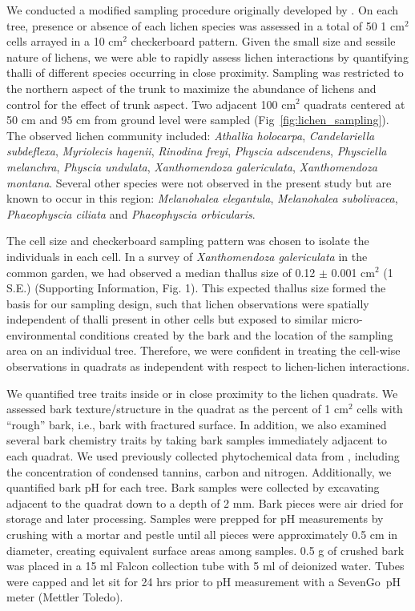 \documentclass[fleqn,12pt]{olplainarticle}
\begin{document}
We conducted a modified sampling procedure originally developed by
\cite{Lamit2015a}. On each tree, presence or absence of each lichen
species was assessed in a total of 50 1 cm$^2$ cells arrayed in a 10
cm$^2$ checkerboard pattern. Given the small size and sessile nature
of lichens, we were able to rapidly assess lichen interactions by
quantifying thalli of different species occurring in close
proximity. Sampling was restricted to the northern aspect of the trunk
to maximize the abundance of lichens and control for the effect of
trunk aspect. Two adjacent 100 cm$^2$ quadrats centered at 50 cm and
95 cm from ground level were sampled
(Fig~\ref{fig:lichen_sampling}). The observed lichen community
included: \textit{Athallia holocarpa}, \textit{Candelariella
  subdeflexa}, \textit{Myriolecis hagenii}, \textit{Rinodina freyi},
\textit{Physcia adscendens}, \textit{Physciella melanchra},
\textit{Physcia undulata}, \textit{Xanthomendoza galericulata},
\textit{Xanthomendoza montana}. Several other species were not
observed in the present study but are known to occur in this region:
\textit{Melanohalea elegantula}, \textit{Melanohalea subolivacea},
\textit{Phaeophyscia ciliata} and \textit{Phaeophyscia orbicularis}.

The cell size and checkerboard sampling pattern was chosen to isolate
the individuals in each cell. In a survey of \textit{Xanthomendoza
  galericulata} in the common garden, we had observed a median thallus
size of 0.12 $\pm$ 0.001 cm$^2$ (1 S.E.)  (Supporting Information,
Fig. 1). This expected thallus size formed the basis for our sampling
design, such that lichen observations were spatially independent of
thalli present in other cells but exposed to similar
micro-environmental conditions created by the bark and the location of
the sampling area on an individual tree. Therefore, we were confident
in treating the cell-wise observations in quadrats as independent with
respect to lichen-lichen interactions. 

We quantified tree traits inside or in close proximity to the lichen
quadrats. We assessed bark texture/structure in the quadrat as the
percent of 1 cm$^2$ cells with ``rough'' bark, i.e., bark with
fractured surface. In addition, we also examined several bark
chemistry traits by taking bark samples immediately adjacent to each
quadrat.  We used previously collected phytochemical data from
\cite{Lamit2011}, including the concentration of condensed tannins,
carbon and nitrogen. Additionally, we quantified bark pH for each
tree.  Bark samples were collected by excavating adjacent to the
quadrat down to a depth of 2 mm. Bark pieces were air dried for
storage and later processing. Samples were prepped for pH measurements
by crushing with a mortar and pestle until all pieces were
approximately 0.5 cm in diameter, creating equivalent surface areas
among samples. 0.5 g of crushed bark was placed in a 15 ml Falcon
collection tube with 5 ml of deionized water. Tubes were capped and
let sit for 24 hrs prior to pH measurement with a
SevenGo\texttrademark\ pH meter (Mettler Toledo).
\end{document}
